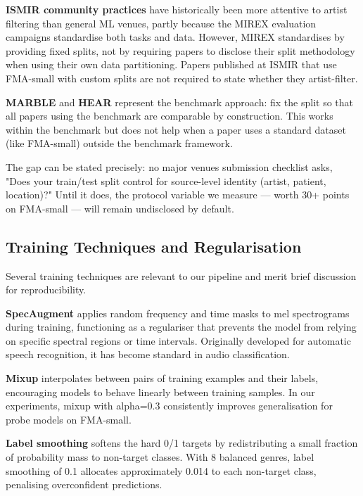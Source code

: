 \documentclass[conference]{IEEEtran}
\begin{document}
\textbf{ISMIR community practices} have historically been more attentive
to artist filtering than general ML venues, partly because the MIREX
evaluation campaigns standardise both tasks and data. However, MIREX
standardises by providing fixed splits, not by requiring papers to
disclose their split methodology when using their own data partitioning.
Papers published at ISMIR that use FMA-small with custom splits are not
required to state whether they artist-filter.

\textbf{MARBLE} \citep{yuan2024marble} and \textbf{HEAR}
\citep{turian2022hear} represent the benchmark approach: fix the split
so that all papers using the benchmark are comparable by construction.
This works within the benchmark but does not help when a paper uses a
standard dataset (like FMA-small) outside the benchmark framework.

The gap can be stated precisely: no major venue\textquotesingle s
submission checklist asks, "Does your train/test split control for
source-level identity (artist, patient, location)?" Until it does, the
protocol variable we measure --- worth 30+ points on FMA-small
--- will remain undisclosed by default.

\subsection{Training Techniques and
Regularisation}\label{j.-training-techniques-and-regularisation}

Several training techniques are relevant to our pipeline and merit brief
discussion for reproducibility.

\textbf{SpecAugment} \citep{park2019specaugment} applies random
frequency and time masks to mel spectrograms during training,
functioning as a regulariser that prevents the model from relying on
specific spectral regions or time intervals. Originally developed for
automatic speech recognition, it has become standard in audio
classification.

\textbf{Mixup} \citep{zhang2018mixup} interpolates between pairs of
training examples and their labels, encouraging models to behave
linearly between training samples. In our experiments, mixup with
alpha=0.3 consistently improves generalisation for probe models on
FMA-small.

\textbf{Label smoothing} \citep{szegedy2016rethinking} softens the hard
0/1 targets by redistributing a small fraction of probability mass to
non-target classes. With 8 balanced genres, label smoothing of 0.1
allocates approximately 0.014 to each non-target class, penalising
overconfident predictions.
\end{document}
